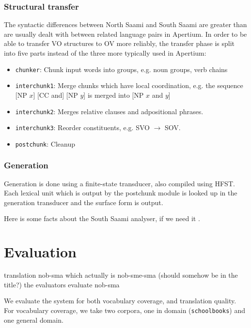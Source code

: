 \documentclass[a4paper,11pt,twocolumn]{article}
\begin{document}
\subsubsection{Structural transfer}

The syntactic differences between North Saami and South Saami are
greater than are usually dealt with between related language pairs
in Apertium. 
In order to be able to transfer VO structures to OV more reliably,
the transfer phase is split into five parts instead of the three
more typically used in Apertium:


\begin{itemize} 
  \item \texttt{chunker}: Chunk input words into groups, e.g. noun groups, verb chains
  \item \texttt{interchunk1}: Merge chunks which have local coordination, e.g. the sequence [NP $x$] [CC and] [NP $y$] is merged into [NP $x$ and $y$]
  \item \texttt{interchunk2}: Merges relative clauses and adpositional phrases.
  \item \texttt{interchunk3}: Reorder constituents, e.g. SVO $\rightarrow$ SOV.
  \item \texttt{postchunk}: Cleanup
\end{itemize}

\subsubsection{Generation}

Generation is done using a finite-state transducer, also 
compiled using HFST. Each lexical unit which is output by
the postchunk module is looked up in the generation transducer
and the surface form is output.

Here is some facts about the South Saami analyser, if we need it \cite{smadis2011}.

\section{Evaluation}
 translation nob-sma which actually is nob-sme-sma (should somehow be in the title?) 
 the evaluators evaluate nob-sma

We evaluate the system for both vocabulary coverage, and translation quality.
For vocabulary coverage, we take two corpora, one in domain (\texttt{schoolbooks}) and 
one general domain. 
\end{document}
